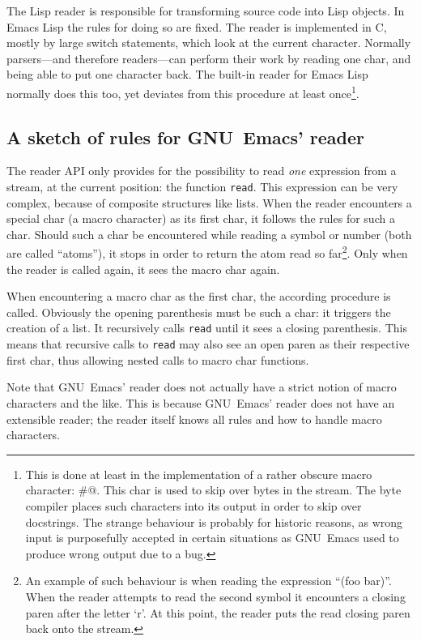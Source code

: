 \documentclass[a4paper,10pt,twoside]{report}
\newcommand{\el}{Emacs Lisp}
\newcommand{\fun}[1]{\texttt{#1}}
\newcommand{\emacs}{GNU~Emacs}
\newcommand{\Read}{\fun{read}}
\begin{document}
The Lisp reader is responsible for transforming source code into Lisp objects.
In \el{} the rules for doing so are fixed.  The reader is implemented in C,
mostly by large switch statements, which look at the current character.
Normally parsers---and therefore readers---can perform their work by reading one
char, and being able to put one character back.  The built-in reader for \el{}
normally does this too, yet deviates from this procedure at least
once\footnote{This is done at least in the implementation of a rather obscure
  macro character: \#@.  This char is used to skip over bytes in the stream.
  The byte compiler places such characters into its output in order to skip over
  docstrings.  The strange behaviour is probably for historic reasons, as wrong
  input is purposefully accepted in certain situations as \emacs{} used to
  produce wrong output due to a bug.}.

\subsection{A sketch of rules for \emacs’ reader}
\label{subsubsec:rules-sketch}

The reader API only provides for the possibility to read \emph{one} expression
from a stream, at the current position: the function \Read{}.  This
expression can be very complex, because of composite structures like lists.
When the reader encounters a special char (a macro character) as its first char,
it follows the rules for such a char.  Should such a char be encountered while
reading a symbol or number (both are called ``atoms''), it stops in order to
return the atom read so far\footnote{An example of such behaviour is when
  reading the expression ``(foo bar)''.  When the reader attempts to read the
  second symbol it encounters a closing paren after the letter `r'.  At this
  point, the reader puts the read closing paren back onto the stream.}.  Only
when the reader is called again, it sees the macro char again.

When encountering a macro char as the first char, the according procedure is
called.  Obviously the opening parenthesis must be such a char: it triggers the
creation of a list.  It recursively calls \Read{} until it sees a closing
parenthesis.  This means that recursive calls to \Read{} may also see an open
paren as their respective first char, thus allowing nested calls to macro char
functions.

Note that \emacs{}’ reader does not actually have a strict notion of macro
characters and the like.  This is because \emacs{}’ reader does not have an
extensible reader; the reader itself knows all rules and how to handle macro
characters.
\end{document}
